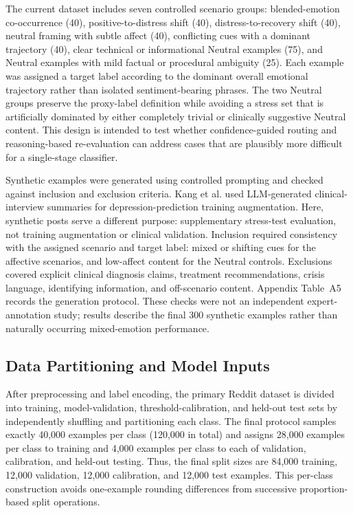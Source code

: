 \documentclass{ieeeaccess}
\begin{document}
The current dataset includes seven controlled scenario groups: blended-emotion co-occurrence (40), positive-to-distress shift (40), distress-to-recovery shift (40), neutral framing with subtle affect (40), conflicting cues with a dominant trajectory (40), clear technical or informational Neutral examples (75), and Neutral examples with mild factual or procedural ambiguity (25). Each example was assigned a target label according to the dominant overall emotional trajectory rather than isolated sentiment-bearing phrases. The two Neutral groups preserve the proxy-label definition while avoiding a stress set that is artificially dominated by either completely trivial or clinically suggestive Neutral content. This design is intended to test whether confidence-guided routing and reasoning-based re-evaluation can address cases that are plausibly more difficult for a single-stage classifier.

Synthetic examples were generated using controlled prompting and checked against inclusion and exclusion criteria. Kang et al. \cite{ref19} used LLM-generated clinical-interview summaries for depression-prediction training augmentation. Here, synthetic posts serve a different purpose: supplementary stress-test evaluation, not training augmentation or clinical validation. Inclusion required consistency with the assigned scenario and target label: mixed or shifting cues for the affective scenarios, and low-affect content for the Neutral controls. Exclusions covered explicit clinical diagnosis claims, treatment recommendations, crisis language, identifying information, and off-scenario content. Appendix Table~A5 records the generation protocol. These checks were not an independent expert-annotation study; results describe the final 300 synthetic examples rather than naturally occurring mixed-emotion performance.

\subsection{Data Partitioning and Model Inputs}

After preprocessing and label encoding, the primary Reddit dataset is divided into training, model-validation, threshold-calibration, and held-out test sets by independently shuffling and partitioning each class. The final protocol samples exactly 40,000 examples per class (120,000 in total) and assigns 28,000 examples per class to training and 4,000 examples per class to each of validation, calibration, and held-out testing. Thus, the final split sizes are 84,000 training, 12,000 validation, 12,000 calibration, and 12,000 test examples. This per-class construction avoids one-example rounding differences from successive proportion-based split operations.
\end{document}
